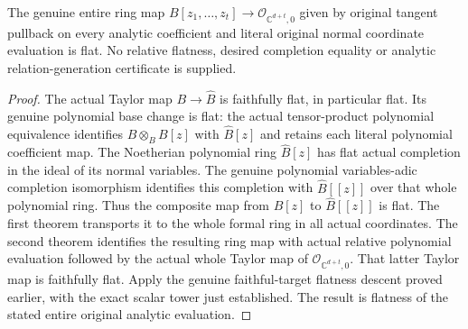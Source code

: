 \begin{theorem}
\label{hir:actual-relative-polynomial-analytic-flatness}
\leanok
The genuine entire ring map
$B[z_1,\ldots,z_t]\to\mathcal O_{\mathbb C^{d+t},0}$
given by original tangent pullback on every analytic coefficient and
literal original normal coordinate evaluation is flat. No relative
flatness, desired completion equality or analytic relation-generation
certificate is supplied.
\end{theorem}
\begin{proof}
The actual Taylor map $B\to\widehat B$ is faithfully flat, in
particular flat. Its genuine polynomial base change is flat: the
actual tensor-product polynomial equivalence identifies
$\widehat B\otimes_B B[z]$ with $\widehat B[z]$ and retains each
literal polynomial coefficient map. The Noetherian polynomial ring
$\widehat B[z]$ has flat actual completion in the ideal of its normal
variables. The genuine polynomial variables-adic completion
isomorphism identifies this completion with $\widehat B[[z]]$ over
that whole polynomial ring. Thus the composite map from $B[z]$ to
$\widehat B[[z]]$ is flat. The first theorem transports it to the
whole formal ring in all actual coordinates. The second theorem
identifies the resulting ring map with actual relative polynomial
evaluation followed by the actual whole Taylor map of
$\mathcal O_{\mathbb C^{d+t},0}$. That latter Taylor map is
faithfully flat. Apply the genuine faithful-target flatness descent
proved earlier, with the exact scalar tower just established. The
result is flatness of the stated entire original analytic evaluation.
\end{proof}


